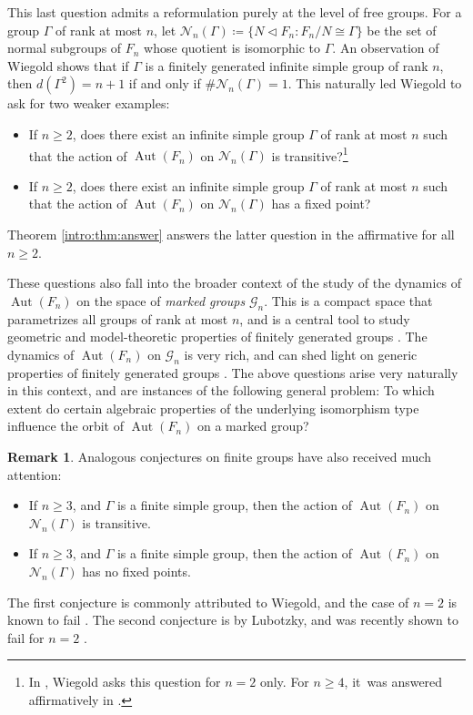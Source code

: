 \documentclass[JEP,XML,SOM,Unicode]{cedram}
\theoremstyle{definition}
\newtheorem{remark}[theorem]{Remark}
\newcommand{\Aut}{\operatorname{Aut}}
\begin{document}
This last question admits a reformulation purely at the level of free groups. For a group $\Gamma$ of rank at most $n$, let $\mathcal{N}_n(\Gamma) \coloneqq \{ N \triangleleft F_n : F_n/N \cong \Gamma \}$ be the set of normal subgroups of $F_n$ whose quotient is isomorphic to $\Gamma$. An observation of Wiegold \cite{w:tarski} shows that if $\Gamma$ is a finitely generated infinite simple group of rank $n$, then $d(\Gamma^2) = n+1$ if and only if $\# \mathcal{N}_n(\Gamma) = 1$. This naturally led Wiegold to ask for two weaker examples:
\begin{itemize}
\item \cite[Quest.\,16.100]{kourovka} If $n \geq 2$, does there exist an infinite simple group $\Gamma$ of rank at most $n$ such that the action of $\Aut(F_n)$ on $\mathcal{N}_n(\Gamma)$ is transitive?\footnote{In \cite[Quest.\,16.100]{kourovka}, Wiegold asks this question for $n = 2$ only. For $n \geq 4$, it~was answered affirmatively in \cite[Th.\,4]{garionglasner}.}
\item \cite[Quest.\,6.45]{kourovka} If $n \geq 2$, does there exist an infinite simple group $\Gamma$ of rank at most $n$ such that the action of $\Aut(F_n)$ on $\mathcal{N}_n(\Gamma)$ has a fixed point?
\end{itemize}
Theorem \ref{intro:thm:answer} answers the latter question in the affirmative for all $n \geq 2$.

These questions also fall into the broader context of the study of the dynamics of $\Aut(F_n)$ on the space of \emph{marked groups} $\mathcal{G}_n$. This is a compact space that parametrizes all groups of rank at most $n$, and is a central tool to study geometric and model-theoretic properties of finitely generated groups \cite{grigorchuk, champetier, limit, diversity, osin:law}. The dynamics of $\Aut(F_n)$ on $\mathcal{G}_n$ is very rich, and can shed light on generic properties of finitely generated groups \cite{osin:aut}. The above questions arise very naturally in this context, and are instances of the following general problem: To which extent do certain algebraic properties of the underlying isomorphism type influence the orbit of $\Aut(F_n)$ on a marked group?

\begin{remark}
\label{rem:finite}
Analogous conjectures on finite groups have also received much attention:
\begin{itemize}
\item \cite[Conj.\,2.5.4]{pak:question} If $n \geq 3$, and $\Gamma$ is a finite simple group, then the action of $\Aut(F_n)$ on $\mathcal{N}_n(\Gamma)$ is transitive.
\item \cite[p.\,25]{lubotzky:question} If $n \geq 3$, and $\Gamma$ is a finite simple group, then the action of $\Aut(F_n)$ on $\mathcal{N}_n(\Gamma)$ has no fixed points.
\end{itemize}
The first conjecture is commonly attributed to Wiegold, and the case of $n = 2$ is known to fail \cite{counterexample, counterexample:statistic}. The second conjecture is by Lubotzky, and was recently shown to fail for $n = 2$ \cite{counterexample:baby, counterexample:baby2}.
\end{remark}
\end{document}
